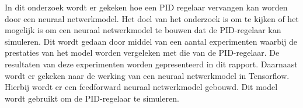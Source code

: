 In dit onderzoek wordt er gekeken hoe een PID regelaar vervangen kan worden door een neuraal netwerkmodel. Het doel van het onderzoek is om te kijken of het mogelijk is om een neuraal netwerkmodel te bouwen dat de PID-regelaar kan simuleren. Dit wordt gedaan door middel van een aantal experimenten waarbij de prestaties van het model worden vergeleken met die van de PID-regelaar. De resultaten van deze experimenten worden gepresenteerd in dit rapport. Daarnaast wordt er gekeken naar de werking van een neuraal netwerkmodel in Tensorflow. Hierbij wordt er een feedforward neuraal netwerkmodel gebouwd. Dit model wordt gebruikt om de PID-regelaar te simuleren. 



